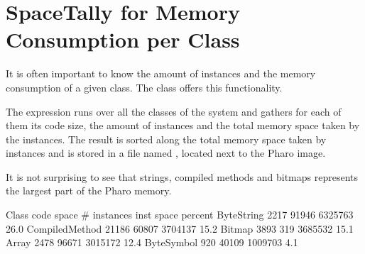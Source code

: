 \documentclass[a4paper,10pt,twoside]{book}
\begin{document}
%
%
%		
%
%


\section{SpaceTally for Memory Consumption per Class}

It is often important to know the amount of instances and the memory consumption of a given class. The class  offers this functionality. 

The expression  runs over all the classes of the system and gathers for each of them its code size, the amount of instances and the total memory space taken by the instances. The result is sorted along the total memory space taken by instances and is stored in a file named , located next to the Pharo image.

It is not surprising to see that strings, compiled methods and bitmaps represents the largest part of the Pharo memory.

\begin{code}{}
Class                          	 code space   # instances  inst space percent
ByteString                        2217       	91946         6325763    26.0
CompiledMethod            	21186      	 60807        3704137    15.2
Bitmap                              3893          319            3685532    15.1
Array                          	      2478      	96671        3015172    12.4
ByteSymbol     					920       	   40109        1009703     4.1
\end{code}
\end{document}
